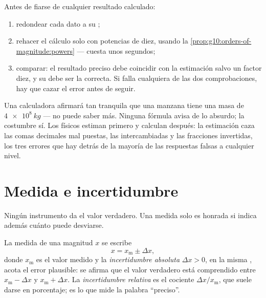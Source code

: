 \begin{method}\label{met:g10:orders-of-magnitude:sanity}
Antes de fiarse de cualquier resultado calculado:
\begin{enumerate}
  \item redondear cada dato a su ;
  \item rehacer el cálculo solo con potencias de diez, usando la
        \cref{prop:g10:orders-of-magnitude:powers} --- cuesta unos
        segundos;
  \item comparar: el resultado preciso debe coincidir con la estimación
        salvo un factor diez, y su  debe ser la correcta. Si falla
        cualquiera de las dos comprobaciones, hay que cazar el error
        antes de seguir.
\end{enumerate}
\end{method}

\begin{remark}\label{rem:g10:orders-of-magnitude:sanity}
Una calculadora afirmará tan tranquila que una manzana tiene una masa de
$\qty{4e8}{kg}$ --- no puede saber más. Ninguna fórmula avisa de lo
absurdo; la costumbre sí. Los físicos estiman primero y calculan
después: la estimación caza las comas decimales mal puestas, las
 intercambiadas y las fracciones invertidas, los tres errores
que hay detrás de la mayoría de las respuestas falsas a cualquier nivel.
\end{remark}

\section{Medida e incertidumbre}

Ningún instrumento da el valor verdadero. Una medida solo es honrada si
indica además cuánto puede desviarse.

\begin{definition}\label{def:g10:orders-of-magnitude:uncertainty}
La medida de una magnitud $x$ se escribe
\[
x = x_{\text{m}} \pm \Delta x ,
\]
donde $x_{\text{m}}$ es el valor medido y la \emph{incertidumbre
absoluta} $\Delta x > 0$, en la misma
, acota el error plausible: se afirma que el valor verdadero está
comprendido entre $x_{\text{m}} - \Delta x$ y $x_{\text{m}} + \Delta x$.
La \emph{incertidumbre relativa} es el
cociente $\Delta x / x_{\text{m}}$, que suele darse en porcentaje; es lo
que mide la palabra ``preciso''.
\end{definition}

